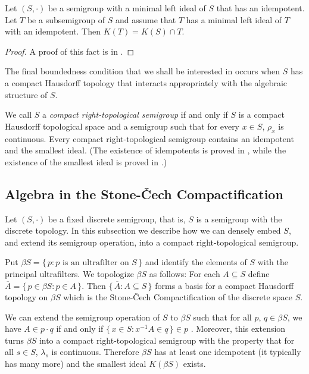 \begin{thm}
  \label{thm:smallest-subsemigrp}
  Let $(S, \cdot)$ be a semigroup with a minimal left ideal of $S$ that has an idempotent. 
  Let $T$ be a subsemigroup of $S$ and assume that $T$ has a minimal left ideal of $T$ with an idempotent.
  Then $K(T) = K(S) \cap T$.
\end{thm}
\begin{proof}
  A proof of this fact is in \cite[Theorem 1.65]{Hindman:1998fk}.
\end{proof}

The final boundedness condition that we shall be interested in occurs when $S$ has a compact Hausdorff topology that interacts appropriately with the algebraic structure of $S$.

We call $S$ a \emph{compact right-topological semigroup} if and only if $S$ is a compact Hausdorff topological space and a semigroup such that for every $x \in S$, $\rho_x$ is continuous. 
Every compact right-topological semigroup contains an idempotent and the smallest ideal.
(The existence of idempotents is proved in \cite[Theorem 2.5]{Hindman:1998fk}, while the existence of the smallest ideal is proved in \cite[Theorem 2.8]{Hindman:1998fk}.)

\subsection{Algebra in the Stone-\v{C}ech Compactification}
Let $(S, \cdot)$ be a fixed discrete semigroup, that is, $S$ is a semigroup with the discrete topology. 
In this subsection we describe how we can densely embed $S$, and extend its semigroup operation, into a compact right-topological semigroup.

Put $\beta S = \{\, p : \mbox{$p$ is an ultrafilter on $S$} \,\}$ and identify the elements of $S$ with the principal ultrafilters.
We topologize $\beta S$ as follows: For each $A \subseteq S$ define $\overline{A} = \{\, p \in \beta S : p \in A \,\}$.
Then $\{\, \overline{A} : A \subseteq S \,\}$ forms a basis for a compact Hausdorff topology on $\beta S$ which is the Stone-\v{C}ech Compactification \cite[Theorem 3.27]{Hindman:1998fk} of the discrete space $S$.

We can extend the semigroup operation of $S$ to $\beta S$ \cite[Theorem 4.1]{Hindman:1998fk} such that for all $p$, $q \in \beta S$, we have $A \in p \cdot q$ if and only if $\{\, x \in S : x^{-1}A \in q \,\} \in p$ \cite[Theorem 4.12(b)]{Hindman:1998fk}.
Moreover, this extension turns $\beta S$ into a compact right-topological semigroup with the property that for all $s \in S$, $\lambda_s$ is continuous. 
Therefore $\beta S$ has at least one idempotent (it typically has many more) and the smallest ideal $K(\beta S)$ exists. 

